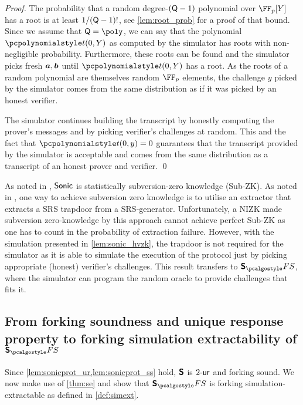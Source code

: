 \documentclass[runningheads,10pt]{llncs}
\let\spvec\vec
\let\vec\accentvec
\let\spvec\vec
\let\vec\spvec
\def\vec#1{\mathchoice{\mbox{\boldmath$\displaystyle#1$}}
  {\mbox{\boldmath$\textstyle#1$}} {\mbox{\boldmath$\scriptstyle#1$}}
  {\mbox{\boldmath$\scriptscriptstyle#1$}}}
\begin{document}
\begin{proof}
The probability that a random degree-$(\mathsf{Q} - 1)$ polynomial over
$\FF_p[Y]$ has a root is at least $1 / (\mathsf{Q} - 1) !$, see
\cref{lem:root_prob} for a proof of that bound. Since we assume that $\linconstr
= \poly$, we can say that the polynomial $\pt(0,Y)$ as computed by the simulator
has roots with non-negligible probability. Furthermore, these roots can be found
and the simulator picks fresh $\vec{a}, \vec{b}$ until $\pt(0,Y)$ has a root. As
the roots of a random polynomial are themselves random $\FF_p$ elements, the
challenge $y$ picked by the simulator comes from the same distribution as if it
was picked by an honest verifier.

The simulator continues building the transcript by honestly computing the
prover's messages and by picking verifier's challenges at random. This and the
fact that $\pt(0,y) = 0$ guarantees that the transcript provided by the simulator is
acceptable and comes from the same distribution as a transcript of an honest
prover and verifier. \qed
\end{proof}

\begin{remark} 
  As noted in \cite{CCS:MBKM19}, ${\textnormal{\textsf{Sonic}}}$ is statistically subversion-zero
  knowledge (Sub-ZK). As noted in \cite{AC:ABLZ17}, one way to achieve
  subversion zero knowledge is to utilise an extractor that extracts a SRS
  trapdoor from a SRS-generator. Unfortunately, a NIZK made subversion
  zero-knowledge by this approach cannot achieve perfect Sub-ZK as one has to
  count in the probability of extraction failure. However, with the simulation
  presented in \cref{lem:sonic_hvzk}, the trapdoor is not required for the
  simulator as it is able to simulate the execution of the protocol just by
  picking appropriate (honest) verifier's challenges. This result transfers to
  $\sonicprotfs$, where the simulator can program the random oracle to provide
  challenges that fits it.
\end{remark}

\subsection{From forking soundness and unique response property to forking simulation extractability of $\sonicprotfs$}
Since \cref{lem:sonicprot_ur,lem:sonicprot_ss} hold, $\bm{\mathsf{S}}$ is ${2\text{-}\mathsf{ur}}$
and forking sound. We now make use
of \cref{thm:se} and show that $\sonicprotfs$ is forking simulation-extractable as defined in \cref{def:simext}.
\end{document}
